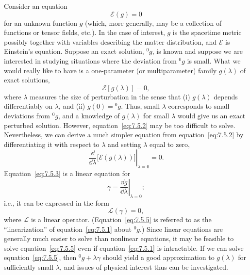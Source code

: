Consider an equation
\begin{equation}
  \mathcal E(g)=0
  \tag{7.5.1}\label{eq:7.5.1}
\end{equation}
for an unknown function \(g\) (which, more generally, may be a collection of
functions or tensor fields, etc.). In the case of interest, \(g\) is the spacetime
metric possibly together with variables describing the matter distribution, and
\(\mathcal E\) is Einstein's equation. Suppose an exact solution, \({}^{0}g\), is
known and suppose we are interested in studying situations where the deviation
from \({}^{0}g\) is small. What we would really like to have is a one-parameter
(or multiparameter) family \(g(\lambda)\) of exact solutions,
\begin{equation}
  \mathcal E[g(\lambda)]=0 ,
  \tag{7.5.2}\label{eq:7.5.2}
\end{equation}
where \(\lambda\) measures the size of perturbation in the sense that
(i) \(g(\lambda)\) depends differentiably on \(\lambda\), and
(ii) \(g(0)={}^{0}g\). Thus, small \(\lambda\) corresponds to small deviations
from \({}^{0}g\), and a knowledge of \(g(\lambda)\) for small \(\lambda\) would
give us an exact perturbed solution. However, equation~\eqref{eq:7.5.2} may be too
difficult to solve. Nevertheless, we can derive a much simpler equation from
equation~\eqref{eq:7.5.2} by differentiating it with respect to \(\lambda\) and
setting \(\lambda\) equal to zero,
\begin{equation}
  \left.
    \frac{\dd}{\dd\lambda}\bigl[\mathcal E(g(\lambda))\bigr]
  \right|_{\lambda=0}=0 .
  \tag{7.5.3}\label{eq:7.5.3}
\end{equation}
Equation~\eqref{eq:7.5.3} is a linear equation for
\begin{equation}
  \gamma=\left.\frac{\dd g}{\dd\lambda}\right|_{\lambda=0} ;
  \tag{7.5.4}\label{eq:7.5.4}
\end{equation}
i.e., it can be expressed in the form
\begin{equation}
  \mathcal L(\gamma)=0 ,
  \tag{7.5.5}\label{eq:7.5.5}
\end{equation}
where \(\mathcal L\) is a linear operator. (Equation~\eqref{eq:7.5.5} is referred
to as the “linearization” of equation~\eqref{eq:7.5.1} about \({}^{0}g\).) Since
linear equations are generally much easier to solve than nonlinear equations, it may
be feasible to solve equation~\eqref{eq:7.5.5} even if
equation~\eqref{eq:7.5.1} is intractable. If we can solve
equation~\eqref{eq:7.5.5}, then \({}^{0}g+\lambda\gamma\) should yield a good
approximation to \(g(\lambda)\) for sufficiently small \(\lambda\), and issues of
physical interest thus can be investigated.

